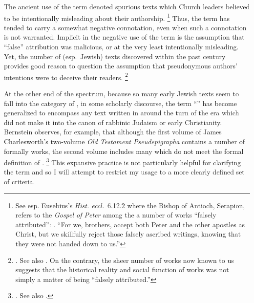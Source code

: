 The ancient use of the term \psa denoted spurious texts which Church leaders believed to be intentionally misleading about their authorship.%
    \footnote{See esp. Eusebius's \emph{Hist. eccl.}~6.12.2 where the Bishop of Antioch, Serapion, refers to the \emph{Gospel of Peter} among the a number of works ``falsely attributed'': . ``For we, brothers, accept both Peter and the other apostles as Christ, but we skillfully reject those falsely ascribed writings, knowing that they were not handed down to us.''}
Thus, the term has tended to carry a somewhat negative connotation, even when such a connotation is not warranted. Implicit in the negative use of the term is the assumption that ``false'' attribution was malicious, or at the very least intentionally misleading. Yet, the number of (esp.~Jewish) \psgraphical texts discovered within the past century provides good reason to question the assumption that pseudonymous authors' intentions were to deceive their readers.%
    \footnote{\Cite[53--58]{mroczek2016}. See also \cite{reed_jts2009}. On the contrary, the sheer number of \psgraphical works now known to us suggests that the historical reality and social function of \psgraphical works was not simply a matter of being ``falsely attributed.''}

At the other end of the spectrum, because so many early Jewish texts seem to fall into the category of \psa, in some scholarly discourse, the term ``\psa'' has become generalized to encompass any text written in around the turn of the era which did not make it into the canon of rabbinic Judaism or early Christianity. Bernstein observes, for example, that although the first volume of James Charlesworth's two-volume \emph{Old Testament Pseudepigrapha} contains a number of formally \psgraphic works, the second volume includes many which do not meet the formal definition of \psa.%
    \footnote{\Cite[2]{bernstein_chazon-etal1999}. See also .}
This expansive practice is not particularly helpful for clarifying the term and so I will attempt to restrict my usage to a more clearly defined set of criteria.

